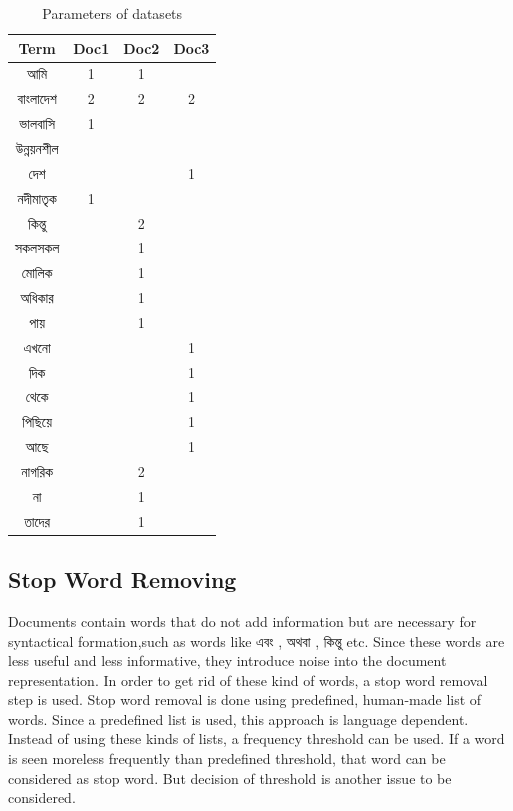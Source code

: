 \begin{table}[htp]	
\centering

  \caption{Parameters of datasets }
\vspace{0.5cm}
\begin{tabular}{|c|c|c|c|} 
\hline

\textbf{Term} &\textbf{Doc1} 	 & \textbf{Doc2} &\textbf{Doc3}   \\ \hline
{\unicodefont আমি} 		& 1 & 1 &	   \\ \hline
{\unicodefont বাংলাদেশ}	& 2 & 2 & 2   \\ \hline
{\unicodefont ভালবাসি }	& 1 &  &   \\ \hline
{\unicodefont উন্নয়নশীল } 	&  &  &   \\ \hline
{\unicodefont দেশ } 	&  &  & 1  \\ \hline
{\unicodefont নদীমাতৃক }  & 1 &  &   \\ \hline
{\unicodefont কিন্তু}	&  & 2 &   \\ \hline
{\unicodefont সকল}সকল	&  & 1 &   \\ \hline
{\unicodefont মোলিক}	&  & 1 &   \\ \hline
{\unicodefont অধিকার}	&  & 1 &   \\ \hline
{\unicodefont পায়}	&  & 1 &   \\ \hline
{\unicodefont এখনো}	&  &  & 1  \\ \hline
{\unicodefont দিক}  &  &  & 1 \\ \hline
{\unicodefont থেকে} &  &  & 1 \\ \hline
{\unicodefont পিছিয়ে}&  &  & 1 \\ \hline
{\unicodefont আছে}&  &  & 1 \\ \hline
{\unicodefont নাগরিক}&  & 2 &  \\ \hline
{\unicodefont না} &  & 1 &  \\ \hline
{\unicodefont তাদের}&  & 1 &  \\ \hline

\end{tabular}
\label{tab:tab1}
\end{table}



\subsection{Stop Word Removing}
Documents contain words that do not add information but are necessary for syntactical formation,such as words like {\unicodefont এবং , অথবা , কিন্তু } etc. Since these words are less useful and less informative,  they introduce  noise into the document representation. In order to get rid of these kind of words, a stop word removal step is used.  Stop word removal is done using predefined, human-made list of words. Since a predefined list is used, this approach is language dependent. Instead of using these kinds of lists, a frequency threshold can be used. If a word is seen more\/less frequently than predefined threshold, that word can be considered as stop word. But decision of threshold is another issue to be considered.

